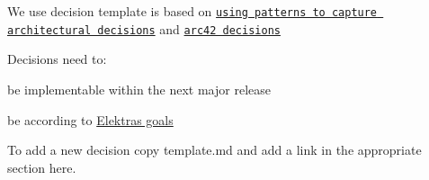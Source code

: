 We use decision template is based on \href{https://dl.acm.org/doi/10.1109/MS.2007.124}{\tt \textquotesingle{}\textquotesingle{}using patterns to capture architectural decisions\textquotesingle{}\textquotesingle{}} and \href{http://docs.arc42.org/section-9/}{\tt arc42 decisions}

Decisions need to\+:


\begin{DoxyItemize}
\item be implementable within the next major release
\item be according to \hyperlink{doc_GOALS_md}{Elektra\textquotesingle{}s goals}
\end{DoxyItemize}

To add a new decision copy {\ttfamily template.\+md} and add a link in the appropriate section here.


